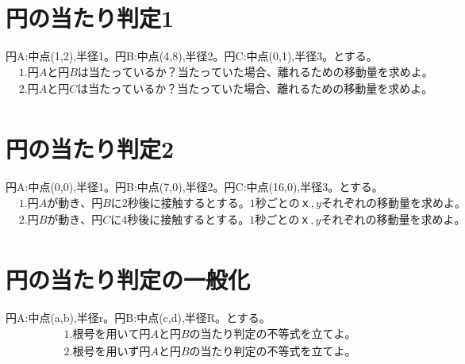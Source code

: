 \documentclass[paper=b4j,landscape,twocolumn,fleqn]{jlreq}
\begin{document}
\section{円の当たり判定1}
円A:中点(1,2),半径1。円B:中点(4,8),半径2。円C:中点(0,1),半径3。とする。
\begin{align*}
　&1.　円Aと円Bは当たっているか？　当たっていた場合、離れるための移動量を求めよ。\\[1em]
　&2.　円Aと円Cは当たっているか？　当たっていた場合、離れるための移動量を求めよ。\\[1em]
\end{align*}
\section{円の当たり判定2}
円A:中点(0,0),半径1。円B:中点(7,0),半径2。円C:中点(16,0),半径3。とする。
\begin{align*}
　&1.　円Aが動き、円Bに2秒後に接触するとする。1秒ごとのｘ,yそれぞれの移動量を求めよ。\\[1em]
　&2.　円Bが動き、円Cに4秒後に接触するとする。1秒ごとのｘ,yそれぞれの移動量を求めよ。\\[1em]
\end{align*}
\section{円の当たり判定の一般化}
円A:中点(a,b),半径r。円B:中点(c,d),半径R。とする。
\begin{align*}
　&1.　根号を用いて円Aと円Bの当たり判定の不等式を立てよ。\\[1em]
　&2.　根号を用いず円Aと円Bの当たり判定の不等式を立てよ。\\[1em]
\end{align*}
\end{document}
